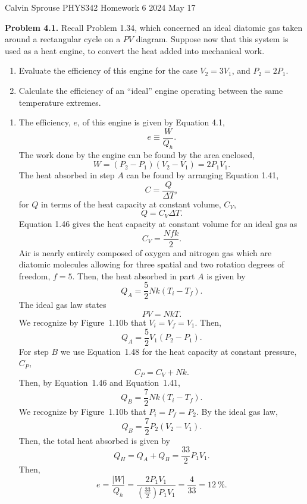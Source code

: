 \documentclass[a4paper, 12pt]{config/homework}
\begin{document}
\noindent
Calvin Sprouse \hfill PHYS342 Homework 6 \hfill 2024 May 17

\bigskip\noindent
\textbf{Problem 4.1.} Recall Problem 1.34, which concerned an ideal diatomic gas taken around a rectangular cycle on a \(PV\) diagram. Suppose now that this system is used as a heat engine, to convert the heat added into mechanical work.
\begin{enumerate}[label=\textbf{(\alph*)}]
\item Evaluate the efficiency of this engine for the case \(V_2 = 3V_1\), and \(P_2 = 2P_1\).
\item Calculate the efficiency of an ``ideal'' engine operating between the same temperature extremes.
\end{enumerate}
\begin{enumerate}[label=\textbf{(\alph*)}]
\bigskip
\item The efficiency, \(e\), of this engine is given by Equation 4.1,
\[e \equiv \frac{W}{Q_h}.\]
The work done by the engine can be found by the area enclosed,
\[W = \left(P_2 - P_1\right)\left(V_2 - V_1\right) = 2 P_1 V_1.\]
The heat absorbed in step \(A\) can be found by arranging Equation 1.41,
\[C = \frac{Q}{\Delta T},\]
for \(Q\) in terms of the heat capacity at constant volume, \(C_V\),
\[Q = C_V \Delta T.\]
Equation 1.46 gives the heat capacity at constant volume for an ideal gas as
\[C_V = \frac{Nfk}{2}.\]
Air is nearly entirely composed of oxygen and nitrogen gas which are diatomic molecules allowing for three spatial and two rotation degrees of freedom, \(f=5\). Then, the heat absorbed in part \(A\) is given by
\[Q_A = \frac{5}{2}Nk(T_i - T_f).\]
The ideal gas law states
\[PV = NkT.\]
We recognize by Figure~1.10b that \(V_i=V_f=V_1\). Then,
\[Q_A = \frac{5}{2}V_1(P_2-P_1).\]
For step \(B\) we use Equation~1.48 for the heat capacity at constant pressure, \(C_P\),
\[C_P = C_V + Nk.\]
Then, by Equation~1.46 and Equation~1.41,
\[Q_B = \frac{7}{2}Nk(T_i-T_f).\]
We recognize by Figure~1.10b that \(P_i = P_f = P_2\). By the ideal gas law,
\[Q_B = \frac{7}{2}P_2(V_2-V_1).\]
Then, the total heat absorbed is given by
\[Q_H = Q_A + Q_B = \frac{33}{2}P_1V_1.\]
Then,
\[e = \frac{|W|}{Q_h} = \frac{2P_1V_1}{\left(\frac{33}{2}\right)P_1V_1} = \frac{4}{33} = \qty{12}{\percent}.\]
\end{enumerate}
\end{document}
